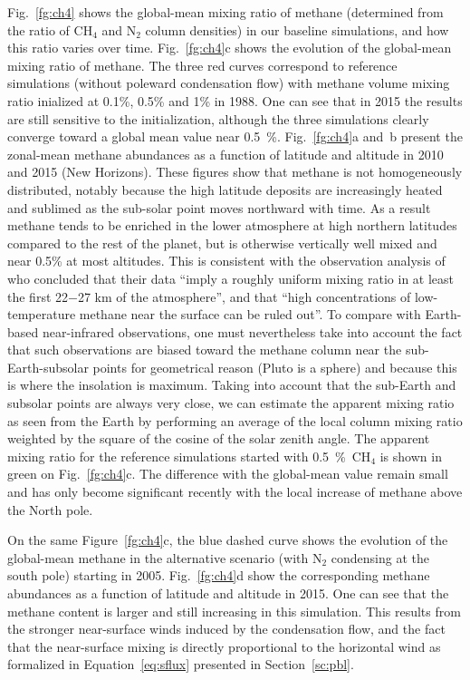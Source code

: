 Fig.~\ref{fg:ch4} shows the global-mean mixing ratio of methane 
(determined from the ratio of CH$_4$ and N$_2$
column densities) 
in our baseline simulations, and how this ratio varies over time.
Fig.~\ref{fg:ch4}c shows the evolution of the global-mean mixing ratio of methane.
The three red curves correspond to reference simulations (without
poleward condensation flow) with methane volume mixing ratio 
inialized at 0.1\%, 0.5\% and 1\% in 1988.
One can see that in 2015 the results are still sensitive to the initialization, although
the three simulations clearly converge toward a global mean value near 0.5~\%.
Fig.~\ref{fg:ch4}a and~b present the zonal-mean methane abundances as a function of latitude and
altitude in 2010 
\citep[mid-point between the 2008 and 2012 observations by][]{Lell:15} and 2015 (New
Horizons). These figures show that methane is not homogeneously distributed, notably
because the high latitude deposits are increasingly heated and sublimed as the sub-solar
point moves northward with time. As a result methane tends to be enriched in the
lower atmosphere at high northern latitudes compared to the rest of the planet, but
is otherwise vertically well mixed and near 0.5\% at most altitudes. This is
consistent with the observation analysis of \cite{Lell:15} who concluded that their 
data ``imply a roughly uniform mixing ratio in at least the first 22$-$27 km of the 
atmosphere'', and that  ``high concentrations of low-temperature methane near the
surface can be ruled out''. To compare with Earth-based near-infrared observations, 
one must nevertheless take into account the fact that such observations are biased
toward the methane column near the sub-Earth-subsolar points for geometrical reason
(Pluto is a sphere) and because this is where the insolation is maximum. 
Taking into account that the sub-Earth and subsolar points are always very close,
we can estimate the apparent mixing ratio as seen from the Earth by 
performing an average of the local column mixing ratio weighted by the square of the
cosine of the solar zenith angle. The apparent mixing ratio for the reference simulations
started with 0.5~\%~CH$_4$ is shown in green on Fig.~\ref{fg:ch4}c. The difference with
the global-mean value remain small and has only become significant
 recently with the local increase of methane above the North pole. 

On the same Figure~\ref{fg:ch4}c, 
the blue dashed curve shows the evolution of the global-mean methane
in the alternative scenario (with N$_2$ condensing at the south pole) starting in 2005.
Fig.~\ref{fg:ch4}d show the corresponding methane abundances as a function of latitude and
altitude in 2015. 
One can see that the methane content is larger and still increasing in this simulation.
This results from the stronger near-surface winds induced by the condensation flow, and
the fact that the near-surface mixing is directly proportional to the horizontal wind as
formalized in Equation~\ref{eq:sflux} presented in Section~\ref{sc:pbl}. 









